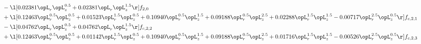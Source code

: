 \begin{alignat}{2}
& - \l[  0.02381 \opL_r \opL_z^{0.5} +  0.02381 \opL_r \opL_z^{1.5}  \r] f_{2,0} \nonumber \\ 
& + \l[  0.12463 \opL_r^{0.5} \opL_z^{0.5} +  0.01523 \opL_r^{1.5} \opL_z^{0.5} +  0.10940 \opL_r^{0.5} \opL_z^{1.5} +  0.09188 \opL_r^{0.5} \opL_z^{2.5} +  0.02288 \opL_r^{1.5} \opL_z^{1.5}   -0.00717 \opL_r^{2.5} \opL_z^{0.5}  \r] f_{c,2,1} \nonumber \\ 
& - \l[  0.04762 \opL_r \opL_z^{0.5} +  0.04762 \opL_r \opL_z^{1.5}  \r] f_{c,2,2} \nonumber \\ 
& + \l[  0.12463 \opL_r^{0.5} \opL_z^{0.5} +  0.01142 \opL_r^{1.5} \opL_z^{0.5} +  0.10940 \opL_r^{0.5} \opL_z^{1.5} +  0.09188 \opL_r^{0.5} \opL_z^{2.5} +  0.01716 \opL_r^{1.5} \opL_z^{1.5}   -0.00526 \opL_r^{2.5} \opL_z^{0.5}  \r] f_{c,2,3} \nonumber \\ 
\end{alignat} 


